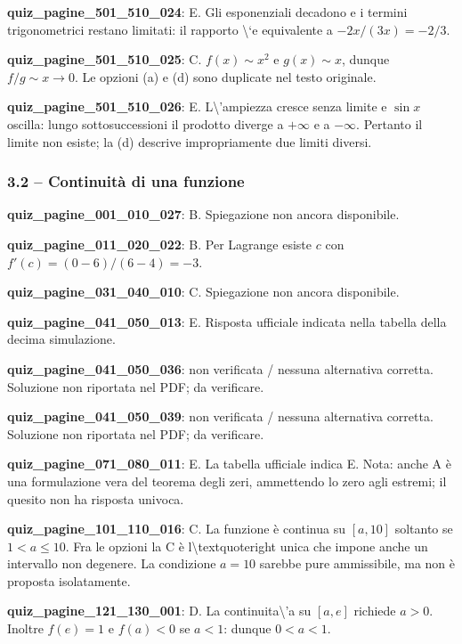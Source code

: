 \documentclass[11pt,a4paper]{article}
\newcounter{quiz}
\begin{document}
\noindent\textbf{quiz\_pagine\_501\_510\_024}: E. Gli esponenziali decadono e i termini trigonometrici restano limitati: il rapporto \textbackslash{}`e equivalente a $-2x/(3x)=-2/3$.\par\medskip
\noindent\textbf{quiz\_pagine\_501\_510\_025}: C. $f(x)\sim x^2$ e $g(x)\sim x$, dunque $f/g\sim x\to0$. Le opzioni (a) e (d) sono duplicate nel testo originale.\par\medskip
\noindent\textbf{quiz\_pagine\_501\_510\_026}: E. L\textbackslash{}'ampiezza cresce senza limite e $\sin x$ oscilla: lungo sottosuccessioni il prodotto diverge a $+\infty$ e a $-\infty$. Pertanto il limite non esiste; la (d) descrive impropriamente due limiti diversi.\par\medskip
\subsubsection*{3.2 -- Continuità di una funzione}
\noindent\textbf{quiz\_pagine\_001\_010\_027}: B. Spiegazione non ancora disponibile.\par\medskip
\noindent\textbf{quiz\_pagine\_011\_020\_022}: B. Per Lagrange esiste $c$ con $f\prime(c)=(0-6)/(6-4)=-3$.\par\medskip
\noindent\textbf{quiz\_pagine\_031\_040\_010}: C. Spiegazione non ancora disponibile.\par\medskip
\noindent\textbf{quiz\_pagine\_041\_050\_013}: E. Risposta ufficiale indicata nella tabella della decima simulazione.\par\medskip
\noindent\textbf{quiz\_pagine\_041\_050\_036}: non verificata / nessuna alternativa corretta. Soluzione non riportata nel PDF; da verificare.\par\medskip
\noindent\textbf{quiz\_pagine\_041\_050\_039}: non verificata / nessuna alternativa corretta. Soluzione non riportata nel PDF; da verificare.\par\medskip
\noindent\textbf{quiz\_pagine\_071\_080\_011}: E. La tabella ufficiale indica E. Nota: anche A è una formulazione vera del teorema degli zeri, ammettendo lo zero agli estremi; il quesito non ha risposta univoca.\par\medskip
\noindent\textbf{quiz\_pagine\_101\_110\_016}: C. La funzione è continua su $[a,10]$ soltanto se $1<a\leq10$. Fra le opzioni la C è l\textbackslash{}textquoteright unica che impone anche un intervallo non degenere. La condizione $a=10$ sarebbe pure ammissibile, ma non è proposta isolatamente.\par\medskip
\noindent\textbf{quiz\_pagine\_121\_130\_001}: D. La continuita\textbackslash{}'a su $[a,e]$ richiede $a>0$. Inoltre $f(e)=1$ e $f(a)<0$ se $a<1$: dunque $0<a<1$.\par\medskip
\end{document}
